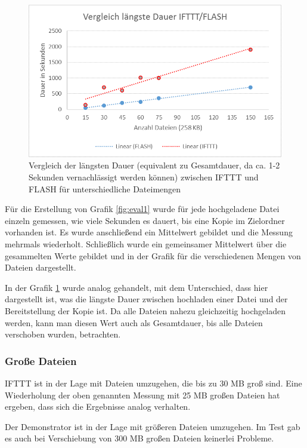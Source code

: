 \begin{figure}
	\centering
	\includegraphics[width=\textwidth]{bilder/vs_laengste}
	\caption{Vergleich der längsten Dauer (equivalent zu Gesamtdauer, da ca. 1-2 Sekunden vernachlässigt werden können) zwischen IFTTT und FLASH für unterschiedliche Dateimengen}
	\label{fig:eval2}
\end{figure}

Für die Erstellung von Grafik \ref{fig:eval1} wurde für jede hochgeladene Datei einzeln gemessen, wie viele Sekunden es dauert, bis eine Kopie im Zielordner vorhanden ist. Es wurde anschließend ein Mittelwert gebildet und die Messung mehrmals wiederholt. Schließlich wurde ein gemeinsamer Mittelwert über die gesammelten Werte gebildet und in der Grafik für die verschiedenen Mengen von Dateien dargestellt.

In der Grafik \ref{fig:eval2} wurde analog gehandelt, mit dem Unterschied, dass hier dargestellt ist, was die längste Dauer zwischen hochladen einer Datei und der Bereitstellung der Kopie ist. Da alle Dateien nahezu gleichzeitig hochgeladen werden, kann man diesen Wert auch als Gesamtdauer, bis alle Dateien verschoben wurden, betrachten.

\subsubsection{Große Dateien}
IFTTT ist in der Lage mit Dateien umzugehen, die bis zu 30 MB groß sind. Eine Wiederholung der oben genannten Messung mit 25 MB großen Dateien hat ergeben, dass sich die Ergebnisse  analog verhalten. 

Der Demonstrator ist in der Lage mit größeren Dateien umzugehen. Im Test gab es auch bei Verschiebung von 300 MB großen Dateien keinerlei Probleme.

